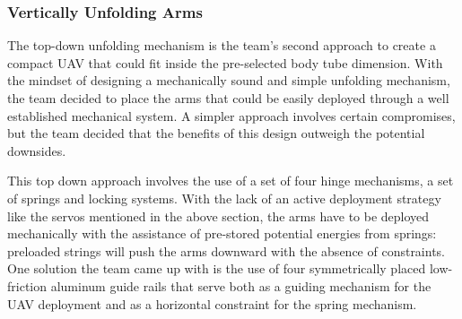 		\subsubsection{Vertically Unfolding Arms}
			The top-down unfolding mechanism is the team’s second approach to create a compact UAV that could fit inside the pre-selected body tube dimension. With the mindset of designing a mechanically sound and simple unfolding mechanism, the team decided to place the arms that could be easily deployed through a well established mechanical system. A simpler approach involves certain compromises, but the team decided that the benefits of this design outweigh the potential downsides. 

			This top down approach involves the use of a set of four hinge mechanisms, a set of springs and locking systems. With the lack of an active deployment strategy like the servos mentioned in the above section, the arms have to be deployed mechanically with the assistance of pre-stored potential energies from springs: preloaded strings will push the arms downward with the absence of constraints. One solution the team came up with is the use of four symmetrically placed low-friction aluminum guide rails that serve both as a guiding mechanism for the UAV deployment and as a horizontal constraint for the spring mechanism.
